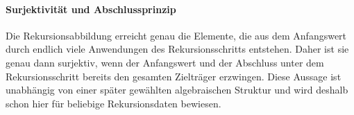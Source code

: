 \documentclass[main.tex]{subfiles}
\begin{document}
\begin{tabproofwide}
\end{tabproofwide}
\paragraph{Surjektivität und Abschlussprinzip}

Die Rekursionsabbildung erreicht genau die Elemente, die aus dem Anfangswert
durch endlich viele Anwendungen des Rekursionsschritts entstehen. Daher ist
sie genau dann surjektiv, wenn der Anfangswert und der Abschluss unter dem
Rekursionsschritt bereits den gesamten Zielträger erzwingen. Diese Aussage
ist unabhängig von einer später gewählten algebraischen Struktur und wird
deshalb schon hier für beliebige Rekursionsdaten bewiesen.
\end{document}
